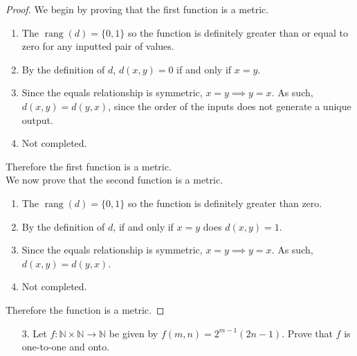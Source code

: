 \documentclass[10pt]{article}
\theoremstyle{definition}
\theoremstyle{plain}
\newcommand{\N}{\mathbb{N}}
\DeclareMathOperator\rang{rang}
\begin{document}
\begin{proof}
  We begin by proving that the first function is a metric.
  \begin{enumerate}
    \item The $\rang(d)=\{0,1\}$ so the function is definitely greater than or equal to zero for any inputted pair of values.
    \item By the definition of $d$, $d(x,y)=0$ if and only if $x=y$.
    \item Since the equals relationship is symmetric, $x=y \implies y=x$. As such, $d(x,y) = d(y,x)$, since the order of the inputs does not generate a unique output.
    \item Not completed.
  \end{enumerate}
  Therefore the first function is a metric. \\

  We now prove that the second function is a metric.
  \begin{enumerate}
    \item The $\rang(d)=\{0,1\}$ so the function is definitely greater than zero.
    \item By the definition of $d$, if and only if $x=y$ does $d(x,y)=1$.
    \item Since the equals relationship is symmetric, $x=y \implies y=x$. As such, $d(x,y) = d(y,x)$.
    \item Not completed.
  \end{enumerate}
  Therefore the function is a metric.
\end{proof}



\pagebreak



\begin{enumerate}
\item[3.] Let $f: \N \times \N \to \N$ be given by $f(m,n) = 2^{m-1}(2n-1)$.  Prove that $f$ is one-to-one and onto.
\end{enumerate}
\end{document}
